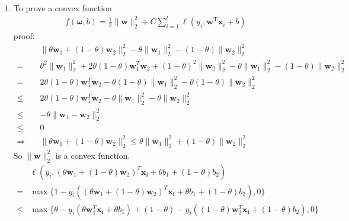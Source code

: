 \documentclass[a4paper]{article}
\begin{document}
\begin{enumerate}
\begin{enumerate}
  \item To prove a convex function
  \begin{equation*}
    \begin{aligned}
      f(\boldsymbol{\omega} ,b) = \frac{1}{2}\|\boldsymbol{w}\|_{2}^{2}+C \sum_{i=1}^{l} \ell\left(y_{i}, \boldsymbol{w}^{\mathrm{T}} \boldsymbol{x}_{i}+b\right)
    \end{aligned}
  \end{equation*}
  proof:
  \begin{equation*}
    \begin{aligned}
      &\|\theta \boldsymbol{w}_{1}+(1-\theta) \boldsymbol{w}_{2}\|_{2}^{2} -\theta \| \boldsymbol{w}_{1}\|_{2}^{2}-(1-\theta) \|\boldsymbol{w}_{2}\|_{2}^{2}\\
      =& \theta^{2}\|\boldsymbol{w}_{1}\|_{2}^{2} + 2\theta(1-\theta)\boldsymbol{w}_{1}^{T} \boldsymbol{w}_{2}+ (1-\theta)^{2} \|\boldsymbol{w}_{2}\|_{2}^{2} -\theta \| \boldsymbol{w}_{1}\|_{2}^{2}-(1-\theta) \|\boldsymbol{w}_{2}\|_{2}^{2}\\
      =& 2\theta(1-\theta)\boldsymbol{w}_{1}^{T} \boldsymbol{w}_{2} - \theta(1-\theta)\|\boldsymbol{w}_{1}\|_{2}^{2} -\theta(1-\theta)\|\boldsymbol{w}_{2}\|_{2}^{2}\\
      \leq &2\theta(1-\theta)\boldsymbol{w}_{1}^{T} \boldsymbol{w}_{2} - \theta\|\boldsymbol{w}_{1}\|_{2}^{2} -\theta\|\boldsymbol{w}_{2}\|_{2}^{2}\\
      \leq &-\theta \|\boldsymbol{w}_{1} - \boldsymbol{w}_{2}\|_{2}^{2}\\
      \leq &0\\
      \Rightarrow \quad& \|\theta \boldsymbol{w}_{1}+(1-\theta) \boldsymbol{w}_{2}\|_{2}^{2}\leq \theta \| \boldsymbol{w}_{1}\|_{2}^{2} + (1-\theta) \| \boldsymbol{w}_{2}\|_{2}^{2}
    \end{aligned}
  \end{equation*}
  So $\|\boldsymbol{w}\|_{2}^{2}$ is a convex function.
  \begin{equation*}
    \begin{aligned}
      &\ell \left(y_i, (\theta \boldsymbol{w}_{1}+(1-\theta) \boldsymbol{w}_{2})^{T} \boldsymbol{x_i}+\theta b_{1}+(1-\theta) b_{2}\right)\\
      =& \max \{1-y_i \left((\theta \boldsymbol{w}_{1}+(1-\theta) \boldsymbol{w}_{2})^{T} \boldsymbol{x_i}+\theta b_{1}+(1-\theta) b_{2}\right), 0\}\\
      \leq &\max \{\theta-y_i (\theta \boldsymbol{w}_{1}^{T}\boldsymbol{x_i}+\theta b_{1}) + (1-\theta)-y_i ((1-\theta) \boldsymbol{w}_{2}^{T}\boldsymbol{x_i} +(1-\theta) b_{2}), 0\}\\

\end{aligned}
\end{equation*}
\end{enumerate}
\end{enumerate}
\end{document}

